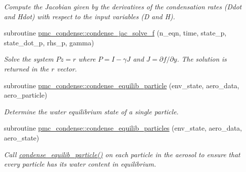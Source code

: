 \begin{DoxyCompactItemize}
\begin{DoxyCompactList}\small\item\em Compute the Jacobian given by the derivatives of the condensation rates (Ddot and Hdot) with respect to the input variables (D and H). \end{DoxyCompactList}\item 
subroutine \mbox{\hyperlink{namespacepmc__condense_a08898f52fc6ece673be5cf7afec66e44}{pmc\+\_\+condense\+::condense\+\_\+jac\+\_\+solve\+\_\+f}} (n\+\_\+eqn, time, state\+\_\+p, state\+\_\+dot\+\_\+p, rhs\+\_\+p, gamma)
\begin{DoxyCompactList}\small\item\em Solve the system $ Pz = r $ where $ P = I - \gamma J $ and $ J = \partial f / \partial y $. The solution is returned in the $ r $ vector. \end{DoxyCompactList}\item 
subroutine \mbox{\hyperlink{namespacepmc__condense_a9439c40ef474d3165689e6c7989ae652}{pmc\+\_\+condense\+::condense\+\_\+equilib\+\_\+particle}} (env\+\_\+state, aero\+\_\+data, aero\+\_\+particle)
\begin{DoxyCompactList}\small\item\em Determine the water equilibrium state of a single particle. \end{DoxyCompactList}\item 
subroutine \mbox{\hyperlink{namespacepmc__condense_a460fbe02310735e79dc7711a8b048fe2}{pmc\+\_\+condense\+::condense\+\_\+equilib\+\_\+particles}} (env\+\_\+state, aero\+\_\+data, aero\+\_\+state)
\begin{DoxyCompactList}\small\item\em Call \mbox{\hyperlink{namespacepmc__condense_a9439c40ef474d3165689e6c7989ae652}{condense\+\_\+equilib\+\_\+particle()}} on each particle in the aerosol to ensure that every particle has its water content in equilibrium. \end{DoxyCompactList}\end{DoxyCompactItemize}
